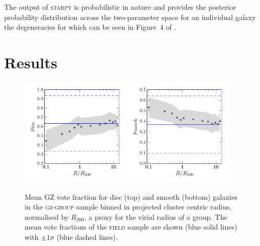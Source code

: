 \documentclass[useAMS,usenatbib]{mn2e}
\def\starpy ~{\textsc{starpy}}
\begin{document}
The output of \starpy  ~ is probabilistic in nature and provides the posterior probability distribution across the two-parameter space for an individual galaxy the degeneracies for which can be seen in Figure~4 of \citet{smethurst15}.

\section{Results}\label{sec:results}

\begin{figure}
\includegraphics[width=0.46\textwidth]{p_disc_trend_with_log_radius_field_compare.pdf}
\includegraphics[width=0.46\textwidth]{p_smooth_trend_with_log_radius_field_compare.pdf}
\caption{Mean GZ vote fraction for disc (top) and smooth (bottom) galaxies in the \textsc{gz-group} sample binned in projected cluster centric radius, normalised by $R_{200}$, a proxy for the virial radius of a group. The mean vote fractions of the \textsc{field} sample are shown (blue solid lines) with $\pm1\sigma$ (blue dashed lines).}
\label{fig:morphradius}
\end{figure}
\end{document}
